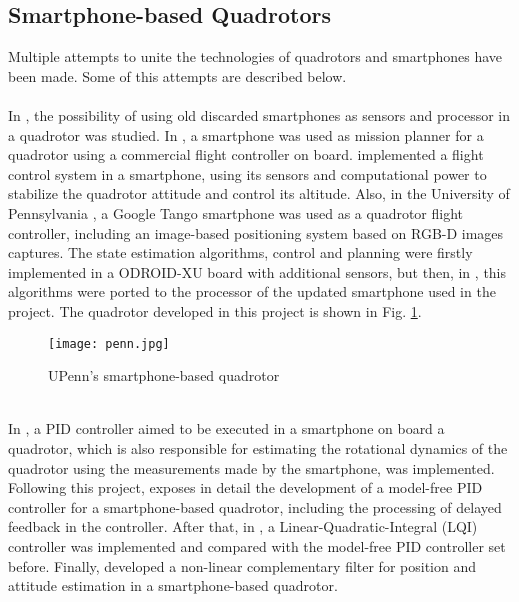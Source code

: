 \subsection{Smartphone-based Quadrotors}
Multiple attempts to unite the technologies of quadrotors and smartphones have been made. Some of this attempts are described below.
\\\\
In \cite{Isuru2017}, the possibility of using old discarded smartphones as sensors and processor in a quadrotor was studied. In \cite{Pearce2014a}, a smartphone was used as mission planner for a quadrotor using a commercial flight controller on board. \cite{ALEMARK2014a} implemented a flight control system in a smartphone, using its sensors and computational power to stabilize the quadrotor attitude and control its altitude. Also, in the University of Pennsylvania \cite{Loianno2015}, a Google Tango smartphone was used as a quadrotor flight controller, including an image-based positioning system based on RGB-D images captures. The state estimation algorithms, control and planning were firstly implemented in a ODROID-XU board with additional sensors, but then, in \cite{Loianno2015a}, this algorithms were ported to the processor of the updated smartphone used in the project. The quadrotor developed in this project is shown in Fig. \ref{fig:penn}.
\begin{figure}[h]
\begin{center}
\texttt{[image: penn.jpg]}    
\caption[UPenn's smartphone-based quadrotor]{UPenn's smartphone-based quadrotor \protect\footnotemark} 
\label{fig:penn}
\end{center}
\end{figure}
\\
In \cite{Alsharif2016}, a PID controller aimed to be executed in a smartphone on board a quadrotor, which is also responsible for estimating the rotational dynamics of the quadrotor using the measurements made by the smartphone, was implemented. Following this project, \cite{Alsharif2017} exposes in detail the development of a model-free PID controller for a smartphone-based quadrotor, including the processing of delayed feedback in the controller. After that, in \cite{Alsharif2017a}, a Linear-Quadratic-Integral (LQI) controller was implemented and compared with the model-free PID controller set before. 
Finally, \cite{Aldrovandi2015} developed a non-linear complementary filter for position and attitude estimation in a smartphone-based quadrotor.

